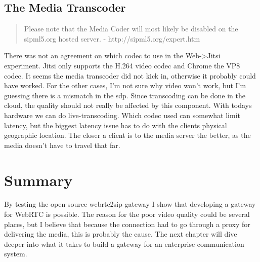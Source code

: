 \subsection{The Media Transcoder}
\begin{quote}
Please note that the Media Coder will most likely be disabled on the sipml5.org hosted server. - http://sipml5.org/expert.htm
\end{quote}
There was not an agreement on which codec to use in the Web->Jitsi experiment. Jitsi only supports the H.264 video codec and Chrome the VP8 codec. It seems the media transcoder did not kick in, otherwise it probably could have worked. For the other cases, I'm not sure why video won't work, but I'm guessing there is a mismatch in the \gls{sdp}. Since transcoding can be done in the cloud, the quality should not really be affected by this component. With todays hardware we can do live-transcoding. Which codec used can somewhat limit latency, but the biggest latency issue has to do with the clients physical geographic location. The closer a client is to the media server the better, as the media doesn't have to travel that far.

\section{Summary}
By testing the open-source webrtc2sip gateway I show that developing a gateway for WebRTC is possible. The reason for the poor video quality could be several places, but I believe that because the connection had to go through a proxy for delivering the media, this is probably the cause. The next chapter will dive deeper into what it takes to build a gateway for an enterprise communication system. 




